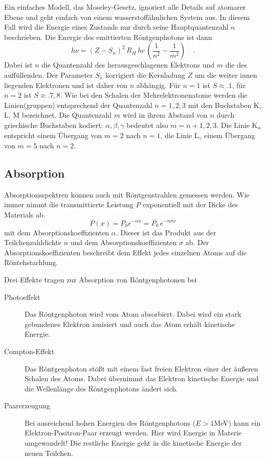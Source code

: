 Ein einfaches Modell, das Moseley-Gesetz, ignoriert alle Details auf atomarer Ebene und geht einfach von einem wasserstoffähnlichen System aus. In diesem Fall wird die Energie eines Zustands nur durch seine Hauptquantenzahl $n$ beschrieben. Die Energie des emittierten Röntgenphotons ist dann 
\begin{equation}
    h \nu = (Z - S_n)^2 \, R_H \, hc \, \left(  \frac{1}{n^2} - \frac{1}{m^2} \right) \quad .
\end{equation}
Dabei ist $n$ die Quantenzahl des herausgeschlagenen Elektrons und $m$ die des auffüllenden. Der Parameter $S_n$ korrigiert die Kernladung $Z$ um die weiter innen liegenden Elektronen und ist daher von $n$ abhängig. Für $n=1$ ist $S \approx. 1$, für $n=2$ ist $S \approx. 7,8$.
Wie bei den Schalen der Mehrelektronenatome werden die Linien(gruppen) entsprechend der Quantenzahl $n = 1, 2, 3$ mit den Buchstaben K, L, M bezeichnet. Die Quantenzahl $m$ wird in ihrem Abstand von $n$ durch griechische Buchstaben kodiert: $\alpha, \beta, \gamma$ bedeutet also $m=n + 1,2,3$. Die Linie K$_\alpha$ entspricht einem Übergang von $m=2$ nach $n=1$, die Linie L$_\gamma$ einem Übergang von $m=5$ nach $n=2$.

\subsection{Absorption}

Absorptionsspektren können auch mit Röntgenstrahlen gemessen werden. Wie immer nimmt die transmittierte Leistung $P$ exponentiell mit der Dicke des Materials ab.
\begin{equation}
    P(x)  = P_0 e^{- \alpha x} = P_0 \, e^{- n \sigma  x}
\end{equation}
mit dem Absorptionskoeffizienten $\alpha$. Dieser ist das Produkt aus der Teilchenzahldichte $n$ und dem Absorptionskoeffizienten $\sigma$ ab. Der Absorptionskoeffizienten beschreibt dem Effekt jedes einzelnen Atoms auf die Röntehstarhlung.

Drei Effekte tragen zur Absorption von Röntgenphotonen bei
\begin{description}
    \item[Photoeffekt] Das Röntgenphoton wird vom Atom absorbiert. Dabei wird ein stark gebundenes Elektron ionisiert und auch das Atom erhält  kinetische Energie.
    \item[Compton-Effekt] Das Röntgenphoton stößt mit einem fast freien Elektron einer der äußeren Schalen des Atoms. Dabei übernimmt das Elektron kinetische Energie und die Wellenlänge des Röntgenphotons ändert sich.
    \item[Paarerzeugung] Bei ausreichend hohen Energien des Röntgenphotons ($E > 1$MeV) kann ein Elektron-Positron-Paar erzeugt werden. Hier wird Energie in Materie umgewandelt! Die restliche Energie geht in die kinetische Energie der neuen Teilchen.
\end{description}

